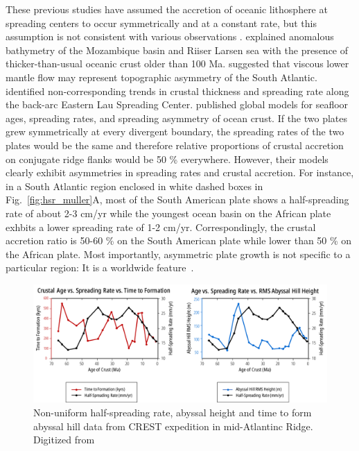 \documentclass[letterpaper,12pt,notitle]{memphisthesis}                     %
\begin{document}
These previous studies have assumed the accretion of oceanic lithosphere at spreading centers to occur symmetrically and at a constant rate, but this assumption is not consistent with various observations \citep{Castelino2016, Flament2014, Martinez2006, Muller1998, Muller2008, Fedotova2017}. \citet{Castelino2016} explained anomalous bathymetry of the Mozambique basin and Riiser Larsen sea with the presence of thicker-than-usual oceanic crust older than 100 Ma. \citet{Flament2014} suggested that viscous lower mantle flow may represent topographic asymmetry of the South Atlantic. \citet{Martinez2006} identified non-corresponding trends in crustal thickness and spreading rate along the back-arc Eastern Lau Spreading Center. \citet{Muller2008} published global models for seafloor ages, spreading rates, and spreading asymmetry of ocean crust. If the two plates grew symmetrically at every divergent boundary, the spreading rates of the two plates would be the same and therefore relative proportions of crustal accretion on conjugate ridge flanks would be 50 \% everywhere. However, their models clearly exhibit asymmetries in spreading rates and crustal accretion. For instance, in a South Atlantic region enclosed in white dashed boxes in Fig.~\ref{fig:hsr_muller}A, most of the South American plate shows a half-spreading rate of about 2-3 cm/yr while the youngest ocean basin on the African plate exhbits a lower spreading rate of 1-2 cm/yr. Correspondingly, the crustal accretion ratio is 50-60 \% on the South American plate while lower than 50 \% on the African plate. Most importantly, asymmetric plate growth is not specific to a particular region: It is a worldwide feature~\citep{Muller2008}.
%
\begin{figure}[!htb]
	\centering
	\includegraphics[width=0.99\linewidth]{./figs/hsrgraph1.pdf}
	\caption{Non-uniform half-spreading rate, abyssal height and time to form abyssal hill data from CREST expedition in mid-Atlantinc Ridge. Digitized from \citet{Fedotova2017}}
	\label{fig:hsr_fedotova}
\end{figure}
\end{document}
